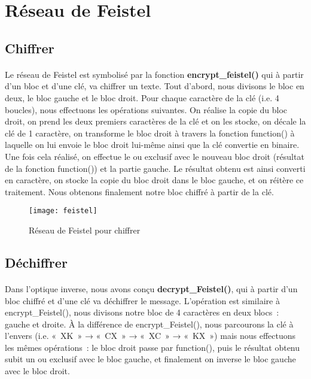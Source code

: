 \documentclass[11pt,fleqn]{book} %
\begin{document}
\section{Réseau de Feistel}

\subsection{Chiffrer}

\paragraph{}Le réseau de Feistel est symbolisé par la fonction \textbf{encrypt\_feistel()} qui à partir d'un bloc et d'une clé, va chiffrer un texte. Tout d'abord, nous divisons le bloc en deux, le bloc gauche et le bloc droit. Pour chaque caractère de la clé (i.e. 4 boucles), nous effectuons les opérations suivantes. On réalise la copie du bloc droit, on prend les deux premiers caractères de la clé et on les stocke, on décale la clé de 1 caractère, on transforme le bloc droit à travers la fonction function() à laquelle on lui envoie le bloc droit lui-même ainsi que la clé convertie en binaire. Une fois cela réalisé, on effectue le ou exclusif avec le nouveau bloc droit (résultat de la fonction function()) et la partie gauche. Le résultat obtenu est ainsi converti en caractère, on stocke la copie du bloc droit dans le bloc gauche, et on réitère ce traitement. Nous obtenons finalement notre bloc chiffré à partir de la clé.
\clearpage
\begin{figure}[!h]
\centering\texttt{[image: feistel]}
\caption{Réseau de Feistel pour chiffrer}
\end{figure}



\subsection{Déchiffrer}

\paragraph{}Dans l'optique inverse, nous avons conçu \textbf{decrypt\_Feistel()}, qui à partir d'un bloc chiffré et d'une clé va déchiffrer le message. L'opération est similaire à encrypt\_Feistel(), nous divisons notre bloc de 4 caractères en deux blocs : gauche et droite. À la différence de encrypt\_Feistel(), nous parcourons la clé à l'envers (i.e. « XK » → « CX » → « XC » → « KX ») mais nous effectuons les mêmes opérations : le bloc droit passe par function(), puis le résultat obtenu subit un ou exclusif avec le bloc gauche, et finalement on inverse le bloc gauche avec le bloc droit.
\end{document}
